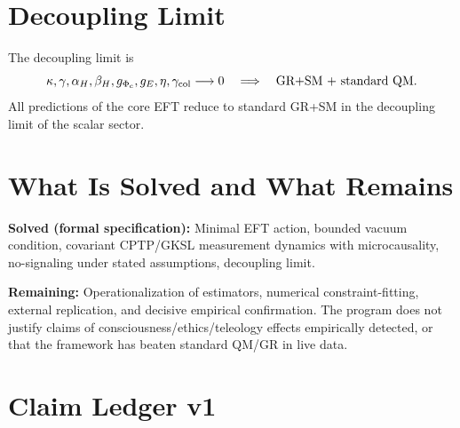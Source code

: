 \documentclass[reprint,amsmath,amssymb,aps,showkeys]{revtex4-2}
\newcommand{\Phic}{\Phi_{\mathrm{c}}}
\newcommand{\Eth}{E}
\begin{document}
\section{Decoupling Limit}
The decoupling limit is
\[
\kappa,\gamma,\alpha_H,\beta_H,g_{\Phic},g_{\Eth},\eta,\gamma_{\rm col}\longrightarrow 0
\quad\Longrightarrow\quad
\text{GR+SM + standard QM}.
\]
All predictions of the core EFT reduce to standard GR+SM in the decoupling limit of the scalar sector.

\section{What Is Solved and What Remains}
\textbf{Solved (formal specification):} Minimal EFT action, bounded vacuum condition, covariant CPTP/GKSL measurement dynamics with microcausality, no-signaling under stated assumptions, decoupling limit.

\textbf{Remaining:} Operationalization of estimators, numerical constraint-fitting, external replication, and decisive empirical confirmation. The program does not justify claims of consciousness/ethics/teleology effects empirically detected, or that the framework has beaten standard QM/GR in live data.

\appendix

\section{Claim Ledger v1}
\label{app:claim_ledger}
\end{document}
